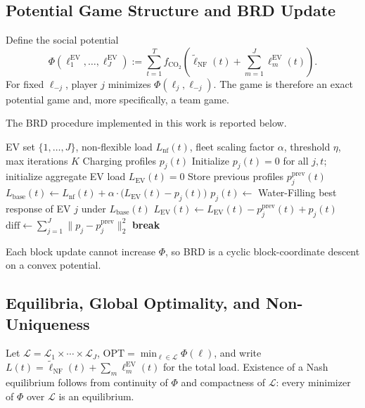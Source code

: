 \documentclass[11pt]{article}
\begin{document}
\subsection{Potential Game Structure and BRD Update}
\label{subsec:potential_structure}

Define the social potential
\begin{equation}
\label{eq:Phi}
\Phi(\ell^{\mathrm{EV}}_1,\dots,\ell^{\mathrm{EV}}_J)
:= \sum_{t=1}^{T} f_{\mathrm{CO}_2}\!\left(\tilde \ell_{\mathrm{NF}}(t)+\sum_{m=1}^J \ell^{\mathrm{EV}}_m(t)\right).
\end{equation}
For fixed $\ell_{-j}$, player $j$ minimizes $\Phi(\ell_j,\ell_{-j})$. The game is therefore an exact potential game and, more specifically, a team game.

The BRD procedure implemented in this work is reported below.

\begin{algorithm}[H]
\caption{Best-Response Dynamics (BRD)}
\label{alg:brd}
\begin{algorithmic}[1]
\Require EV set $\{1,\dots,J\}$, non-flexible load $L_{\mathrm{nf}}(t)$, fleet scaling factor $\alpha$, threshold $\eta$, max iterations $K$
\Ensure Charging profiles $p_j(t)$
\State Initialize $p_j(t)=0$ for all $j,t$; initialize aggregate EV load $L_{\mathrm{EV}}(t)=0$
    \State Store previous profiles $p_j^{\mathrm{prev}}(t)$
        \State $L_{\mathrm{base}}(t)\gets L_{\mathrm{nf}}(t)+\alpha\cdot\big(L_{\mathrm{EV}}(t)-p_j(t)\big)$
        \State $p_j(t)\gets$ Water-Filling best response of EV $j$ under $L_{\mathrm{base}}(t)$
        \State $L_{\mathrm{EV}}(t)\gets L_{\mathrm{EV}}(t)-p_j^{\mathrm{prev}}(t)+p_j(t)$
    \EndFor
    \State $\mathrm{diff}\gets\sum_{j=1}^J\|p_j-p_j^{\mathrm{prev}}\|_2^2$
        \State \textbf{break}
    \EndIf
\EndFor
\end{algorithmic}
\end{algorithm}

Each block update cannot increase $\Phi$, so BRD is a cyclic block-coordinate descent on a convex potential.

\subsection{Equilibria, Global Optimality, and Non-Uniqueness}
\label{subsec:poa_equilibria}

Let $\mathcal L=\mathcal L_1\times\cdots\times\mathcal L_J$, $\mathrm{OPT}=\min_{\ell\in\mathcal L}\Phi(\ell)$, and write $L(t)=\tilde\ell_{\mathrm{NF}}(t)+\sum_{m}\ell^{\mathrm{EV}}_m(t)$ for the total load. Existence of a Nash equilibrium follows from continuity of $\Phi$ and compactness of $\mathcal L$: every minimizer of $\Phi$ over $\mathcal L$ is an equilibrium.
\end{document}
